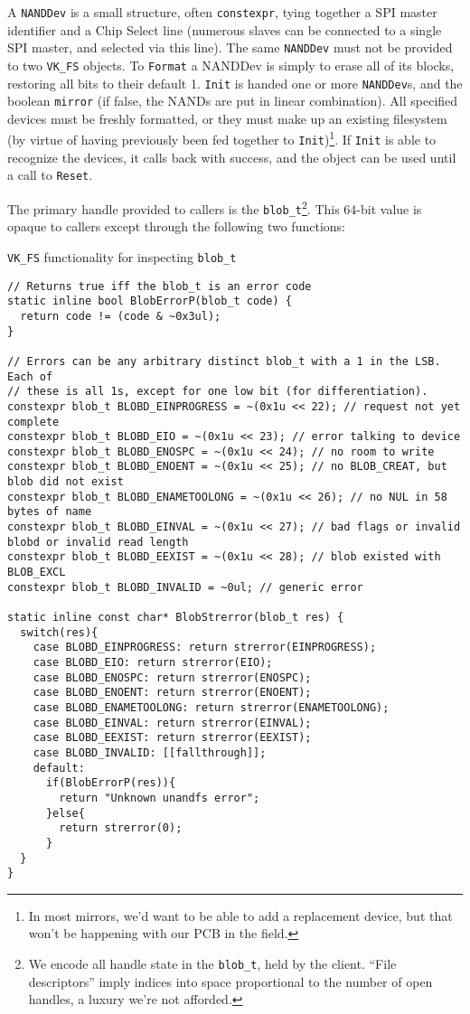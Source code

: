 \documentclass[letterpaper,10pt]{article}
\begin{document}
A {\texttt{NANDDev}} is a small structure, often {\texttt{constexpr}}, tying
together a SPI master identifier and a Chip Select line (numerous slaves can be
connected to a single SPI master, and selected via this line). The same {\texttt{NANDDev}}
must not be provided to two {\texttt{VK\_FS}} objects. To {\texttt{Format}} a
NANDDev is simply to erase all of its blocks, restoring all bits to their default
1. {\texttt{Init}} is handed one or more {\texttt{NANDDev}}s, and the boolean
{\texttt{mirror}} (if false, the NANDs are put in linear combination). All
specified devices must be freshly formatted, or they must make up an existing
filesystem (by virtue of having previously been fed together to
{\texttt{Init}})\footnote{In most mirrors, we'd want to be able to add a
  replacement device, but that won't be happening with our PCB in the field.}.
If {\texttt{Init}} is able to recognize the devices, it calls back with
success, and the object can be used until a call to {\texttt{Reset}}.

The primary handle provided to callers is the {\texttt{blob\_t}}\footnote{We encode
all handle state in the \texttt{blob\_t}, held by the client. ``File descriptors''
imply indices into space proportional to the number of open handles, a luxury we're not afforded.}.
This 64-bit value is opaque to callers except through the following two
functions:

\begin{listing}[ht]
\caption{{\texttt{VK\_FS}} functionality for inspecting {\texttt{blob\_t}}}
\begin{verbatim}
// Returns true iff the blob_t is an error code
static inline bool BlobErrorP(blob_t code) {
  return code != (code & ~0x3ul);
}

// Errors can be any arbitrary distinct blob_t with a 1 in the LSB. Each of
// these is all 1s, except for one low bit (for differentiation).
constexpr blob_t BLOBD_EINPROGRESS = ~(0x1u << 22); // request not yet complete
constexpr blob_t BLOBD_EIO = ~(0x1u << 23); // error talking to device
constexpr blob_t BLOBD_ENOSPC = ~(0x1u << 24); // no room to write
constexpr blob_t BLOBD_ENOENT = ~(0x1u << 25); // no BLOB_CREAT, but blob did not exist
constexpr blob_t BLOBD_ENAMETOOLONG = ~(0x1u << 26); // no NUL in 58 bytes of name
constexpr blob_t BLOBD_EINVAL = ~(0x1u << 27); // bad flags or invalid blobd or invalid read length
constexpr blob_t BLOBD_EEXIST = ~(0x1u << 28); // blob existed with BLOB_EXCL
constexpr blob_t BLOBD_INVALID = ~0ul; // generic error

static inline const char* BlobStrerror(blob_t res) {
  switch(res){
    case BLOBD_EINPROGRESS: return strerror(EINPROGRESS);
    case BLOBD_EIO: return strerror(EIO);
    case BLOBD_ENOSPC: return strerror(ENOSPC);
    case BLOBD_ENOENT: return strerror(ENOENT);
    case BLOBD_ENAMETOOLONG: return strerror(ENAMETOOLONG);
    case BLOBD_EINVAL: return strerror(EINVAL);
    case BLOBD_EEXIST: return strerror(EEXIST);
    case BLOBD_INVALID: [[fallthrough]];
    default:
      if(BlobErrorP(res)){
        return "Unknown unandfs error";
      }else{
        return strerror(0);
      }
  }
}
\end{verbatim}
\end{listing}
\end{document}
